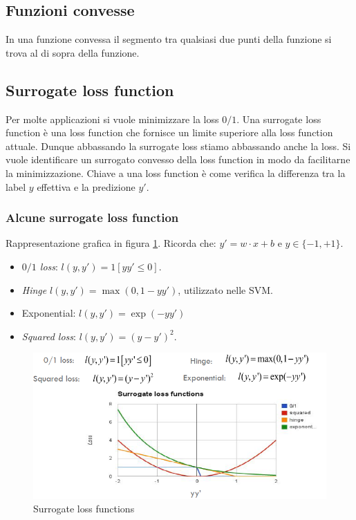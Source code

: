 	\subsection{Funzioni convesse}
	In una funzione convessa il segmento tra qualsiasi due punti della funzione si trova al di sopra della funzione.

	\subsection{Surrogate loss function}
	Per molte applicazioni si vuole minimizzare la loss $0/1$.
	Una surrogate loss function \`e una loss function che fornisce un limite superiore alla loss function attuale. Dunque abbassando la surrogate loss stiamo abbassando anche la loss.
	Si vuole identificare un surrogato convesso della loss function in modo da facilitarne la minimizzazione.
	Chiave a una loss function \`e come verifica la differenza tra la label $y$ effettiva e la predizione $y'$.

		\subsubsection{Alcune surrogate loss function}
		
		Rappresentazione grafica in figura \ref{fig:chapter08-00}.
		Ricorda che: $y' = w \cdot x + b$ e $y \in \{-1,+1\}$.
		\begin{multicols}{2}
			\begin{itemize}
				\item \emph{$0/1$ loss}: $l(y, y')=1[yy'\le 0]$.
				\item \emph{Hinge} $l(y,y')=\max(0,1-yy')$, utilizzato nelle SVM.
				\item Exponential: $l(y,y')=\exp(-yy')$
				\item \emph{Squared loss}: $l(y,y')=(y-y')^2$.
			\end{itemize}
		\end{multicols}
	
		\begin{figure}
			\centering
			\includegraphics[width=0.6\linewidth]{imgs/chapter8/img0}
			\caption{Surrogate loss functions}
			\label{fig:chapter08-00}
		\end{figure}
	
